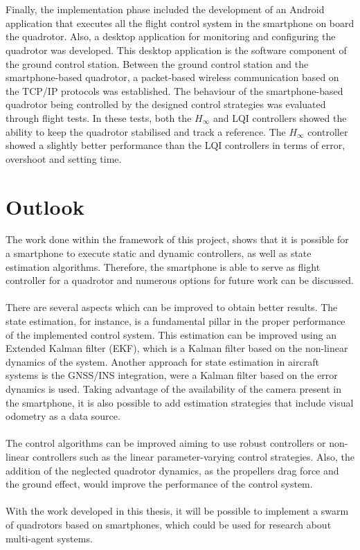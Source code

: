 \\\\
Finally, the implementation phase included the development of an Android application that executes all the flight control system in the smartphone on board the quadrotor. Also, a desktop application for monitoring and configuring the quadrotor was developed. This desktop application is the software component of the ground control station. Between the ground control station and the smartphone-based quadrotor, a packet-based wireless communication based on the TCP/IP protocols was established. The behaviour of the smartphone-based quadrotor being controlled by the designed control strategies was evaluated through flight tests. In these tests, both the $H_\infty$ and LQI controllers showed the ability to keep the quadrotor stabilised and track a reference. The $H_\infty$ controller showed a slightly better performance than the LQI controllers in terms of error, overshoot and setting time.


\section{Outlook}
The work done within the framework of this project, shows that it is possible for a smartphone to execute static and dynamic controllers, as well as state estimation algorithms. Therefore, the smartphone is able to serve as flight controller for a quadrotor and numerous options for future work can be discussed.
\\\\
There are several aspects which can be improved to obtain better results. The state estimation, for instance, is a fundamental pillar in the proper performance of the implemented control system. This estimation can be improved using an Extended Kalman filter (EKF), which is a Kalman filter based on the non-linear dynamics of the system. Another approach for state estimation in aircraft systems is the GNSS/INS integration, were a Kalman filter based on the error dynamics is used. Taking advantage of the availability of the camera present in the smartphone, it is also possible to add estimation strategies that include visual odometry as a data source.
\\\\
The control algorithms can be improved aiming to use robust controllers or non-linear controllers such as the linear parameter-varying control strategies. Also, the addition of the neglected quadrotor dynamics, as the propellers drag force and the ground effect, would improve the performance of the control system.
\\\\
With the work developed in this thesis, it will be possible to implement a swarm of quadrotors based on smartphones, which could be used for research about multi-agent systems.